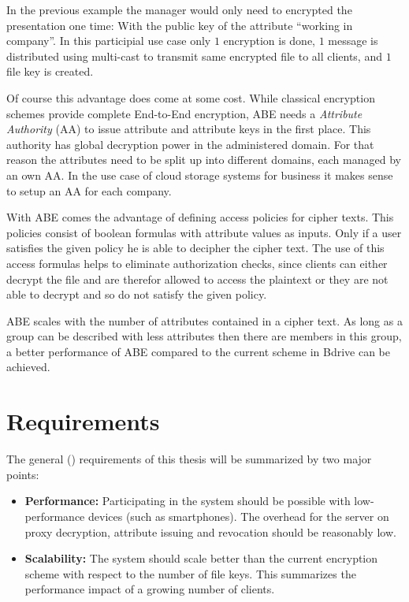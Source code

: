 In the previous example the manager would only need to encrypted the presentation one time: With the public key of the attribute “working in company”. In this participial use case only $1$ encryption is done, $1$ message is distributed using multi-cast to transmit same encrypted file to all clients, and $1$ file key is created. 

Of course this advantage does come at some cost. While classical encryption schemes provide complete End-to-End encryption, ABE needs a \textit{Attribute Authority} (\ac{AA}) to issue attribute and attribute keys in the first place. This authority has global decryption power in the administered domain. For that reason the attributes need to be split up into different domains, each managed by an own AA. In the use case of cloud storage systems for business it makes sense to setup an AA for each company. 

With ABE comes the advantage of defining access policies for cipher texts. This policies consist of boolean formulas with attribute values as inputs. Only if a user satisfies the given policy he is able to decipher the cipher text. The use of this access formulas helps to eliminate authorization checks, since clients can either decrypt the file and are therefor allowed to access the plaintext or they are not able to decrypt and so do not satisfy the given policy. 


ABE scales with the number of attributes contained in a cipher text. As long as a group can be described with less attributes then there are members in this group, a better performance of ABE compared to the current scheme in Bdrive can be achieved. 

\section{Requirements}
\label{sec:requirements}
The general () requirements of this thesis will be summarized by two major points: 

\begin{itemize}
	\item[\req{B1}] \textbf{Performance:} Participating in the system should be possible with low-performance devices (such as smartphones). The overhead for the server on proxy decryption, attribute issuing and revocation should be reasonably low.  
	\item[\req{B2}] \textbf{Scalability:} The system should scale better than the current encryption scheme with respect to the number of file keys. This summarizes the performance impact of a growing number of clients.
\end{itemize}


